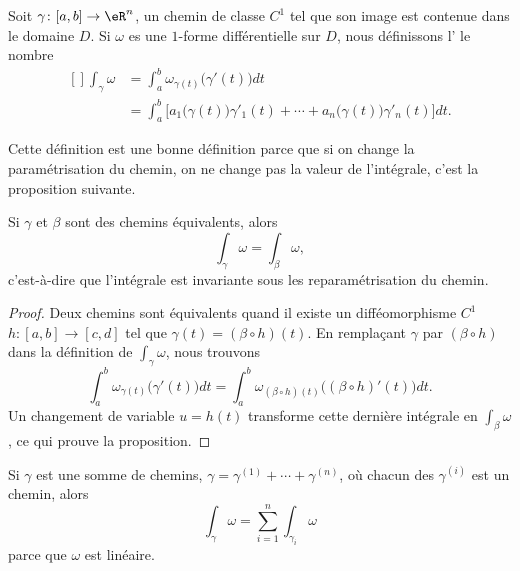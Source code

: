 \begin{definition}
	Soit $\gamma\colon [a,b]\to \eR^n$, un chemin de classe $C^1$ tel que son image est contenue dans le domaine $D$. Si $\omega$ es une $1$-forme différentielle sur $D$, nous définissons l' le nombre
	\begin{equation}
		\begin{aligned}[]
			\int_{\gamma}\omega&=\int_a^b\omega_{\gamma(t)}\big( \gamma'(t) \big)dt\\
				&=\int_a^b\Big[ a_1\big( \gamma(t) \big)\gamma'_1(t)+\cdots +  a_n\big( \gamma(t) \big)\gamma'_n(t) \Big]dt.
		\end{aligned}
	\end{equation}
\end{definition}

Cette définition est une bonne définition parce que si on change la paramétrisation du chemin, on ne change pas la valeur de l'intégrale, c'est la proposition suivante.
\begin{proposition}
	Si $\gamma$ et $\beta$ sont des chemins équivalents, alors
	\begin{equation}
		\int_{\gamma}\omega=\int_{\beta}\omega,
	\end{equation}
	c'est-à-dire que l'intégrale est invariante sous les reparamétrisation du chemin.
\end{proposition}
\begin{proof}
	Deux chemins sont équivalents quand il existe un difféomorphisme $C^1$ $h\colon [a,b]\to [c,d]$ tel que $\gamma(t)=(\beta\circ h)(t)$. En remplaçant $\gamma$ par $(\beta\circ h)$ dans la définition de $\int_{\gamma}\omega$, nous trouvons
	\begin{equation}
		\int_a^b\omega_{\gamma(t)}\big( \gamma'(t) \big)dt=\int_a^b\omega_{(\beta\circ h)(t)}\big( (\beta\circ h)'(t) \big)dt.
	\end{equation}
	Un changement de variable $u=h(t)$ transforme cette dernière intégrale en $\int_{\beta}\omega$, ce qui prouve la proposition.
\end{proof}

\begin{remark}
	Si $\gamma$ est une somme de chemins, $\gamma=\gamma^{(1)}+\cdots+\gamma^{(n)}$, où chacun des $\gamma^{(i)}$ est un chemin, alors
	\begin{equation}
		\int_{\gamma}\omega=\sum_{i=1}^n\int_{\gamma_i}\omega
	\end{equation}
	parce que $\omega$ est linéaire.
\end{remark}

